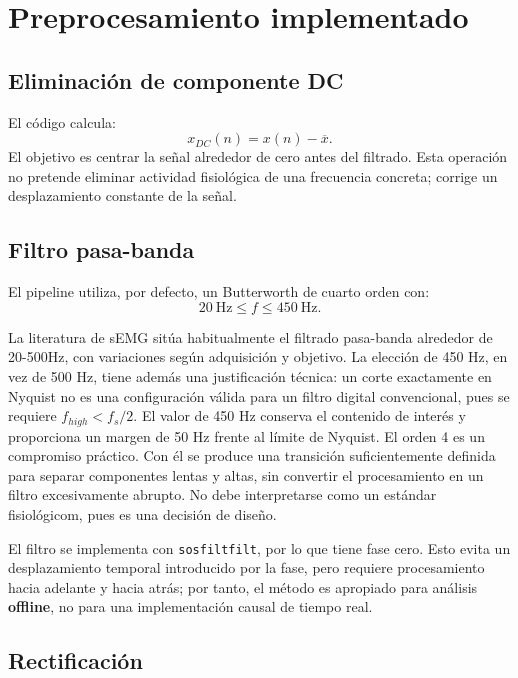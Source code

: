 \documentclass[11pt,spanish]{article}
\begin{document}
\section{Preprocesamiento implementado}

\subsection{Eliminación de componente DC}

El código calcula:
\begin{equation}
x_{DC}(n)=x(n)-\overline{x}.
\end{equation}
El objetivo es centrar la señal alrededor de cero antes del filtrado. Esta operación no pretende eliminar actividad fisiológica de una frecuencia concreta; corrige un desplazamiento constante de la señal.

\subsection{Filtro pasa-banda}

El pipeline utiliza, por defecto, un Butterworth de cuarto orden con:
\begin{equation}
20\ \mathrm{Hz}\leq f\leq450\ \mathrm{Hz}.
\end{equation}

La literatura de sEMG sitúa habitualmente el filtrado pasa-banda alrededor de 20-500Hz, con variaciones según adquisición y objetivo. 
La elección de 450 Hz, en vez de 500 Hz, tiene además una justificación técnica: un corte exactamente en Nyquist no es una configuración válida para un filtro digital convencional, pues se requiere $f_{high}<f_s/2$. El valor de 450 Hz conserva el contenido de interés y proporciona un margen de 50 Hz frente al límite de Nyquist.
El orden 4 es un compromiso práctico. Con él se produce una transición suficientemente definida para separar componentes lentas y altas, sin convertir el procesamiento en un filtro excesivamente abrupto. No debe interpretarse como un estándar fisiológicom, pues es una decisión de diseño.

El filtro se implementa con \texttt{sosfiltfilt}, por lo que tiene fase cero. Esto evita un desplazamiento temporal introducido por la fase, pero requiere procesamiento hacia adelante y hacia atrás; por tanto, el método es apropiado para análisis \textbf{offline}, no para una implementación causal de tiempo real.

\subsection{Rectificación}
\end{document}

